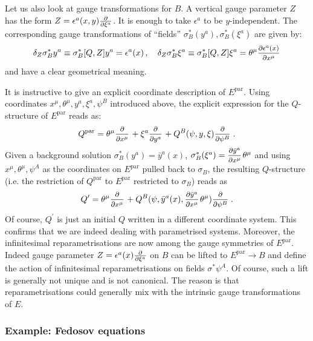 \documentclass[a4paper,12pt]{article}
\numberwithin{equation}{section} %
\renewcommand{\d}{\partial}
\newcommand{\commut}[2]{[#1{,}\,#2]}
\newcommand{\ffrac}[2]{\raisebox{.5pt}%
  {\footnotesize$\displaystyle\frac{#1}{#2}$}\kern1pt}
\newcommand{\dl}[1]{\mathchoice{\ffrac{\d}{\d #1}}{\frac{\d}{\d #1}}{\ffrac{\d}{\d #1}}{\ffrac{\d}{\d #1}}}
\newcommand{\ddl}[2]{\ffrac{\d #1}{\d #2}}
\begin{document}
 Let us also look at gauge transformations for $B$. A vertical gauge parameter $Z$ has the form $Z=\epsilon^a(x,y)\dl{\xi^a}$. It is enough to take $\epsilon^a$ to be $y$-independent. The corresponding gauge transformations of ``fields'' $\sigma^*_B(y^a),\sigma^*_B(\xi^a)$ are given by:
\begin{equation}
\delta_Z \sigma^*_B y^a\equiv \sigma^*_B\commut{Q}{Z}y^a=\epsilon^a(x)\,,
\quad 
\delta_Z \sigma^*_B \xi^a\equiv \sigma^*_B\commut{Q}{Z}\xi^a=\theta^\mu \ddl{\epsilon^a(x)}{x^\mu}
\end{equation}
and have a clear geometrical meaning.




It is instructive to give an explicit coordinate description of $E^{\mathrm{par}}$. Using coordinates $x^\mu,\theta^\mu,y^a,\xi^a,\psi^B$ introduced above, the explicit expression for the $Q$-structure of $E^{\mathrm{par}}$ reads as:
\begin{equation}
Q^{\mathrm{par}}=\theta^\mu\dl{x^\mu}+\xi^a\dl{y^a}+Q^B(\psi,y,\xi)\dl{\psi^B}\,.
\end{equation}
Given a background solution $\sigma_B^*(y^a)=\bar y^a(x)$, $\sigma_B^*(\xi^a)=\ddl{\bar y^a}{x^\mu}\theta^\mu$ and using $x^\mu,\theta^\mu,\psi^A$ as the coordinates on $E^{\mathrm{par}}$ pulled back to $\sigma_B$, the resulting $Q$-structure (i.e. the restriction of $Q^{\mathrm{par}}$ to $E^{\mathrm{par}}$ restricted to $\sigma_B$) reads as
\begin{equation}
Q^\prime=\theta^\mu\dl{x^\mu}+Q^B(\psi,\bar y^a(x),\ddl{\bar y^a}{x^\mu}\theta^\mu)\dl{\psi^B}\,.
\end{equation}
Of course, $Q^\prime$ is just an initial $Q$ written in a different coordinate system. This confirms that we are indeed dealing with parametrised systems. Moreover, the infinitesimal reparametrisations are now among the gauge symmetries of $E^{\mathrm{par}}$. Indeed gauge parameter $Z=\epsilon^a(x)\dl{\xi^a}$ on $B$ can be lifted to $E^{\mathrm{par}} \to B$ and define the action of infinitesimal reparametrisations on fields $\sigma^*\psi^A$.  Of course, such a lift is generally not unique and is not canonical. The reason is that reparametrisations could generally mix with the intrinsic gauge transformations of $E$.



\subsubsection{Example: Fedosov equations}
\end{document}
